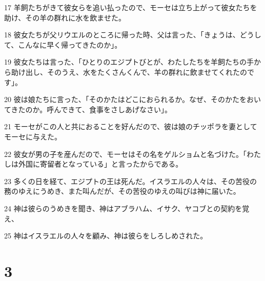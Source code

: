 \par 17 羊飼たちがきて彼女らを追い払ったので、モーセは立ち上がって彼女たちを助け、その羊の群れに水を飲ませた。
\par 18 彼女たちが父リウエルのところに帰った時、父は言った、「きょうは、どうして、こんなに早く帰ってきたのか」。
\par 19 彼女たちは言った、「ひとりのエジプトびとが、わたしたちを羊飼たちの手から助け出し、そのうえ、水をたくさんくんで、羊の群れに飲ませてくれたのです」。
\par 20 彼は娘たちに言った、「そのかたはどこにおられるか。なぜ、そのかたをおいてきたのか。呼んできて、食事をさしあげなさい」。
\par 21 モーセがこの人と共におることを好んだので、彼は娘のチッポラを妻としてモーセに与えた。
\par 22 彼女が男の子を産んだので、モーセはその名をゲルショムと名づけた。「わたしは外国に寄留者となっている」と言ったからである。
\par 23 多くの日を経て、エジプトの王は死んだ。イスラエルの人々は、その苦役の務のゆえにうめき、また叫んだが、その苦役のゆえの叫びは神に届いた。
\par 24 神は彼らのうめきを聞き、神はアブラハム、イサク、ヤコブとの契約を覚え、
\par 25 神はイスラエルの人々を顧み、神は彼らをしろしめされた。

\chapter{3}

